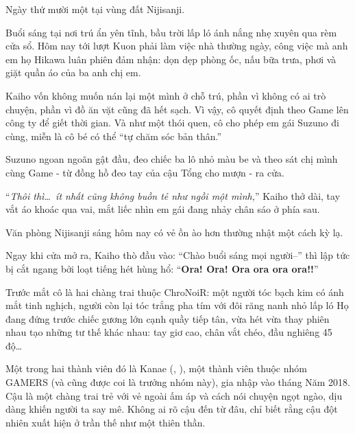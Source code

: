 \documentclass[../main.tex]{subfiles}
\begin{document}

Ngày thứ mười một tại vùng đất Nijisanji.

Buổi sáng tại nơi trú ẩn yên tĩnh, bầu trời lấp ló ánh nắng nhẹ xuyên qua rèm cửa sổ. Hôm nay tới lượt Kuon phải làm việc nhà thường ngày, công việc mà anh em họ Hikawa luân phiên đảm nhận: dọn dẹp phòng ốc, nấu bữa trưa, phơi và giặt quần áo của ba anh chị em.

Kaiho vốn không muốn nán lại một mình ở chỗ trú, phần vì không có ai trò chuyện, phần vì đồ ăn vặt cũng đã hết sạch. Vì vậy, cô quyết định theo Game lên công ty để giết thời gian. Và như một thói quen, cô cho phép em gái Suzuno đi cùng, miễn là cô bé có thể ``tự chăm sóc bản thân.''

Suzuno ngoan ngoãn gật đầu, đeo chiếc ba lô nhỏ màu be và theo sát chị mình cùng Game - từ đồng hồ đeo tay của cậu Tổng cho mượn - ra cửa.

``\textit{Thôi thì\dots\ ít nhất cũng không buồn tẻ như ngồi một mình,}'' Kaiho thở dài, tay vắt áo khoác qua vai, mắt liếc nhìn em gái đang nhảy chân sáo ở phía sau.

\ct

Văn phòng Nijisanji sáng hôm nay có vẻ ồn ào hơn thường nhật một cách kỳ lạ.

Ngay khi cửa mở ra, Kaiho thò đầu vào: ``Chào buổi sáng mọi người--'' thì lập tức bị cắt ngang bởi loạt tiếng hét hùng hổ: ``\textbf{Ora! Ora! Ora ora ora ora!!}''

Trước mắt cô là hai chàng trai thuộc ChroNoiR: một người tóc bạch kim có ánh mắt tinh nghịch, người còn lại tóc trắng pha tím với đôi răng nanh nhỏ lấp ló  Họ đang đứng trước chiếc gương lớn cạnh quầy tiếp tân, vừa hét vừa thay phiên nhau tạo những tư thế khác nhau: tay giơ cao, chân vắt chéo, đầu nghiêng 45 độ\dots

\chrint

Một trong hai thành viên đó là Kanae (, ), một thành viên thuộc nhóm GAMERS (và cũng được coi là trưởng nhóm này), gia nhập vào tháng Năm 2018. Cậu là một chàng trai trẻ với vẻ ngoài ấm áp và cách nói chuyện ngọt ngào, dịu dàng khiến người ta say mê. Không ai rõ cậu đến từ đâu, chỉ biết rằng cậu đột nhiên xuất hiện ở trần thế như một thiên thần.
\end{document}
